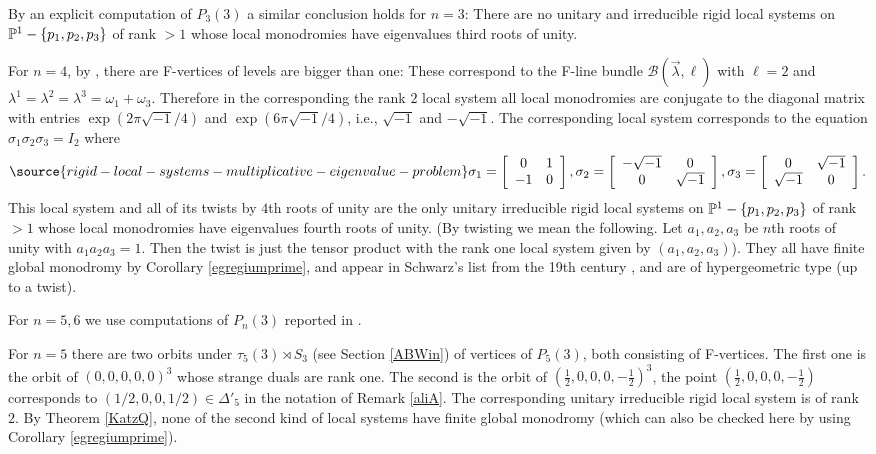 By an explicit computation of $P_3(3)$ a similar conclusion holds for $n=3$: There are no unitary and irreducible  rigid local systems on $\Bbb{P}^{1}-\{p_1,p_2,p_3\}$ of rank $>1$ whose local monodromies have eigenvalues third roots of unity.

For $n=4$, by \cite[Section 7]{BLocal}, there are F-vertices of levels are bigger than one: These correspond to the  F-line bundle $\mathcal{B}(\vec{\lambda},\ell)$ with $\ell=2$ and $\lambda^1=\lambda^2=\lambda^3=\omega_1+\omega_3$. Therefore in the corresponding the rank $2$ local system   all local monodromies are conjugate to the diagonal matrix with entries $\exp(2\pi\sqrt{-1}/4)$ and $\exp(6\pi\sqrt{-1}/4)$, i.e., $\sqrt{-1}$ and $-\sqrt{-1}$.  The corresponding local system corresponds to the equation $\sigma_1\sigma_2\sigma_3=I_2$ where
\begin{equation}\label{dfnsigma}
\source{rigid-local-systems-multiplicative-eigenvalue-problem}
   \sigma_1=
  \left[ {\begin{array}{cc}
   0 & 1 \\
   -1 & 0 \\
  \end{array} }\right],   \sigma_2=
  \left[ {\begin{array}{cc}
   -\sqrt{-1} & 0 \\
   0 & \sqrt{-1} \\
  \end{array} }\right],  \sigma_3=
  \left[ {\begin{array}{cc}
   0 & \sqrt{-1} \\
   \sqrt{-1} & 0 \\
  \end{array} }\right].
  \end{equation}
This local system and all of its twists by $4$th roots of unity  are the only unitary irreducible rigid local systems on $\Bbb{P}^{1}-\{p_1,p_2,p_3\}$ of rank $>1$ whose local monodromies have eigenvalues fourth roots of unity.
(By twisting we mean the following. Let $a_1,a_2,a_3$ be $n$th roots of unity with $a_1a_2a_3=1$.  Then the twist is just the tensor product with the rank one local system given by $(a_1,a_2,a_3)$). They all have finite global monodromy by Corollary \ref{egregiumprime}, and appear in Schwarz's list from the 19th century \cite{Schwarz}, and are of hypergeometric type (up to a twist).

For $n=5,6$ we use computations of $P_n(3)$ reported in \cite{thaddy}.

For $n=5$ there are two orbits under $\tau_5(3)\rtimes S_3$ (see Section \ref{ABWin})  of vertices of $P_5(3)$, both consisting of F-vertices. The first one is the orbit of $(0,0,0,0,0)^3$ whose strange duals are rank one. The second is the orbit of $(\frac{1}{2},0,0,0,-\frac{1}{2})^3$, the point $(\frac{1}{2},0,0,0,-\frac{1}{2})$ corresponds to $(1/2,0,0,1/2)\in\Delta'_5$ in the notation of Remark \ref{aliA}.
The corresponding unitary irreducible rigid local system is of rank $2$. By Theorem \ref{KatzQ}, none of the second kind of local systems have finite global monodromy (which can also be checked here by using Corollary \ref{egregiumprime}).

